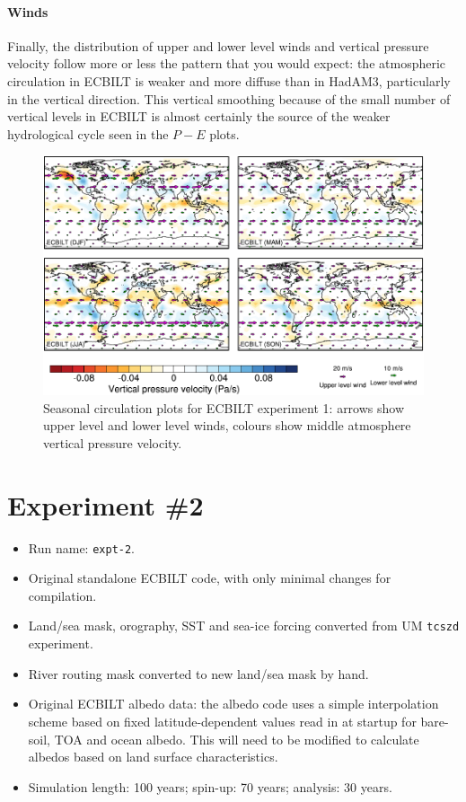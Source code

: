 \documentclass[a4paper,11pt,article]{article}
\begin{document}
\paragraph{Winds}

Finally, the distribution of upper and lower level winds and vertical
pressure velocity follow more or less the pattern that you would
expect: the atmospheric circulation in ECBILT is weaker and more
diffuse than in HadAM3, particularly in the vertical direction.  This
vertical smoothing because of the small number of vertical levels in
ECBILT is almost certainly the source of the weaker hydrological cycle
seen in the $P-E$ plots.

\begin{figure}
  \begin{center}
    \includegraphics[width=\textwidth]{../expt-1/plots/wind-plots}
  \end{center}
  \caption{Seasonal circulation plots for ECBILT experiment 1: arrows
    show upper level and lower level winds, colours show middle
    atmosphere vertical pressure velocity.}
  \label{fig:wind-1}
\end{figure}


\section{Experiment \#2}

\begin{itemize}
  \item{Run name: \texttt{expt-2}.}
  \item{Original standalone ECBILT code, with only minimal changes for
    compilation.}
  \item{Land/sea mask, orography, SST and sea-ice forcing converted
    from UM \texttt{tcszd} experiment.}
  \item{River routing mask converted to new land/sea mask by hand.}
  \item{Original ECBILT albedo data: the albedo code uses a simple
    interpolation scheme based on fixed latitude-dependent values read
    in at startup for bare-soil, TOA and ocean albedo.  This will need
    to be modified to calculate albedos based on land surface
    characteristics.}
  \item{Simulation length: 100 years; spin-up: 70 years; analysis: 30
    years.}
\end{itemize}
\end{document}
